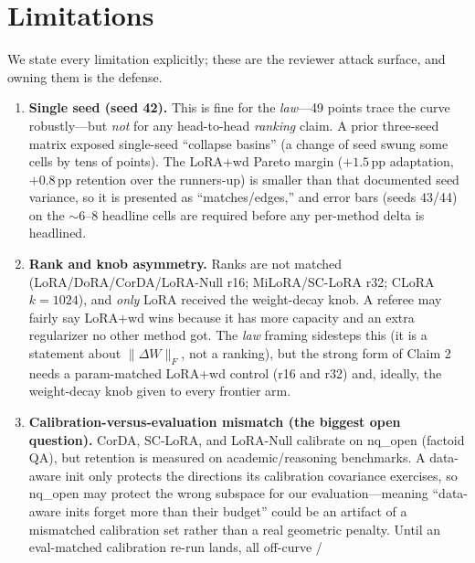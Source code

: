 \documentclass[11pt]{article}
\newcommand{\dw}{\lVert\Delta W\rVert_F}
\begin{document}
\section{Limitations}\label{sec:limits}
We state every limitation explicitly; these are the reviewer attack surface, and owning
them is the defense.

\begin{enumerate}
  \item \textbf{Single seed (seed 42).} This is fine for the \emph{law}---49 points trace
        the curve robustly---but \emph{not} for any head-to-head \emph{ranking} claim.
        A prior three-seed matrix exposed single-seed ``collapse basins'' (a change of
        seed swung some cells by tens of points). The LoRA{+}wd Pareto margin
        ($+1.5$\,pp adaptation, $+0.8$\,pp retention over the runners-up) is smaller than
        that documented seed variance, so it is presented as ``matches/edges,'' and error
        bars (seeds 43/44) on the $\sim$6--8 headline cells are required before any
        per-method delta is headlined.
  \item \textbf{Rank and knob asymmetry.} Ranks are not matched (LoRA/DoRA/CorDA/LoRA-Null
        r16; MiLoRA/SC-LoRA r32; CLoRA $k{=}1024$), and \emph{only} LoRA received the
        weight-decay knob. A referee may fairly say LoRA{+}wd wins because it has more
        capacity and an extra regularizer no other method got. The \emph{law} framing
        sidesteps this (it is a statement about $\dw$, not a ranking), but the strong form
        of Claim 2 needs a param-matched LoRA{+}wd control (r16 and r32) and, ideally, the
        weight-decay knob given to every frontier arm.
  \item \textbf{Calibration-versus-evaluation mismatch (the biggest open question).} CorDA,
        SC-LoRA, and LoRA-Null calibrate on nq\_open (factoid QA), but retention is
        measured on academic/reasoning benchmarks. A data-aware init only protects the
        directions its calibration covariance exercises, so nq\_open may protect the wrong
        subspace for our evaluation---meaning ``data-aware inits forget more than their
        budget'' could be an artifact of a mismatched calibration set rather than a real
        geometric penalty. Until an eval-matched calibration re-run lands, all off-curve /

\end{enumerate}
\end{document}
